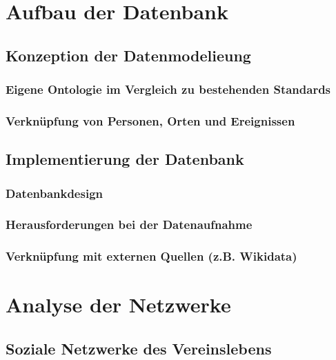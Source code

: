 \documentclass[12pt, a4paper, ngerman, bidi=default]{article}
\begin{document}
\section{Aufbau der Datenbank}
    \subsection{Konzeption der Datenmodelieung}
      \subsubsection{Eigene Ontologie im Vergleich zu bestehenden Standards}
      \subsubsection{Verknüpfung von Personen, Orten und Ereignissen}
    
    \subsection{Implementierung der Datenbank}
      \subsubsection{Datenbankdesign}
      \subsubsection{Herausforderungen bei der Datenaufnahme}
      \subsubsection{Verknüpfung mit externen Quellen (z.B. Wikidata)}

    \newpage
\section{Analyse der Netzwerke}
  \subsection{Soziale Netzwerke des Vereinslebens}
\end{document}
